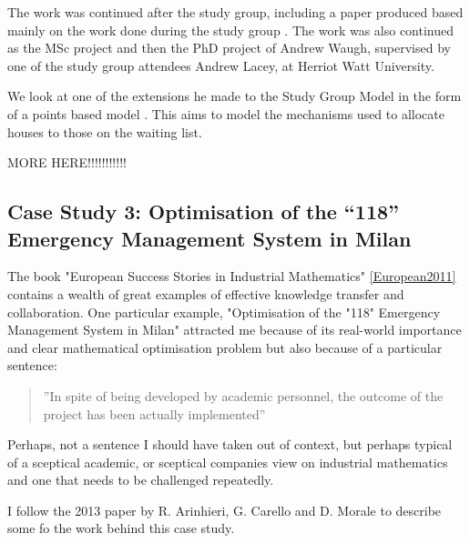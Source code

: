 \documentclass[11pt]{article} %
\begin{document}
	The work was continued after the study group, including a paper produced based mainly on the work done during the study group \cite{Byatt-Smith2003}. The work was also continued as the MSc project and then the PhD project of Andrew Waugh, supervised by one of the study group attendees Andrew Lacey, at Herriot Watt University. 
	
	We look at one of the extensions he made to the Study Group Model in the form of a points based model \cite{Waugh1999}. This aims to model the mechanisms used to allocate houses to those on the waiting list. 
	
	MORE HERE!!!!!!!!!!!
	
	\subsection{Case Study 3: Optimisation of the “118” Emergency Management System in Milan \label{Milan} }
	The book "European Success Stories in Industrial Mathematics" \ref{European2011} contains a wealth of great examples of effective knowledge transfer and collaboration. One particular example, "Optimisation of the "118" Emergency Management System in Milan" attracted me because of its real-world importance and clear mathematical optimisation problem but also because of a particular sentence: 
	
	\begin{quote}
		''In spite of being developed by academic personnel, the outcome of the project has been actually implemented''
	\end{quote}

	Perhaps, not a sentence I should have taken out of context, but perhaps typical of a sceptical academic, or sceptical companies view on industrial mathematics and one that needs to be challenged repeatedly. 
	
	

	I follow the 2013 paper by R. Arinhieri, G. Carello and D. Morale \cite{Carello2013}  to describe some fo the work behind this case study.
	
\end{document}
